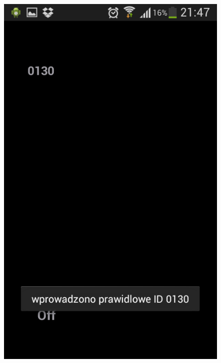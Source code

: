 \documentclass[eng,printmode,oneside]{mgr}
\begin{document}
\begin{figure}
{\includegraphics[height=0.33\textheight]{andID.png}
}
\end{figure}
\end{document}
